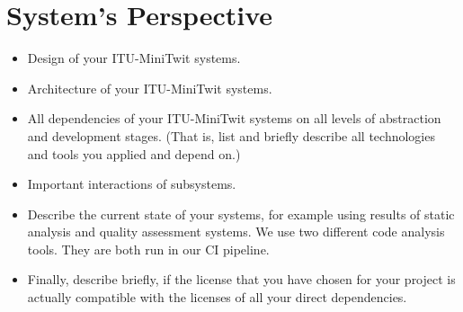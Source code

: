 \section{System's Perspective}

\begin{itemize}
  \item Design of your ITU-MiniTwit systems.
  \item Architecture of your ITU-MiniTwit systems.
  \item All dependencies of your ITU-MiniTwit systems on all levels of abstraction and development stages. (That is, list and briefly describe all technologies and tools you applied and depend on.)
  \item Important interactions of subsystems.
  \item Describe the current state of your systems, for example using results of static analysis and quality assessment systems.
        We use two different code analysis tools. They are both run in our CI pipeline.
        
  \item Finally, describe briefly, if the license that you have chosen for your project is actually compatible with the licenses of all your direct dependencies.
  
\end{itemize}